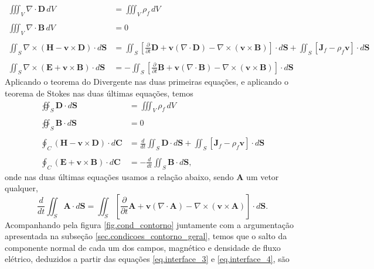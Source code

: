 \begin{align*}
\iiint_V\nabla\cdot\mathbf{D}\,dV&=\iiint_V\rho_f\,dV\\\\
\iiint_V\nabla\cdot\mathbf{B}\,dV&=0\\\\
\iint_S\nabla\times(\mathbf{H}-\mathbf{v}\times\mathbf{D})\cdot d\mathbf{S}&=\iint_S\left[\frac{\partial}{\partial t}\mathbf{D}+\mathbf{v}(\nabla\cdot\mathbf{D})-\nabla\times(\mathbf{v}\times\mathbf{B})\right]\cdot d\mathbf{S}+\iint_S\left[\mathbf{J}_f-\rho_f\mathbf{v}\right]\cdot d\mathbf{S}\\\\
\iint_S\nabla\times(\mathbf{E}+\mathbf{v}\times\mathbf{B})\cdot d\mathbf{S}&=-\iint_S\left[\frac{\partial}{\partial t}\mathbf{B}+\mathbf{v}(\nabla\cdot\mathbf{B})-\nabla\times(\mathbf{v}\times\mathbf{B})\right]\cdot d\mathbf{S}
\end{align*}
Aplicando o teorema do Divergente nas duas primeiras equa\c{c}\~oes, e aplicando o teorema de Stokes nas duas \'ultimas equa\c{c}\~oes, temos
\begin{align}\label{eq.interface_3}
\oiint_S\mathbf{D}\cdot d\mathbf{S}&=\iiint_V\rho_f\,dV\\\nonumber\\\label{eq.interface_4}
\oiint_S\mathbf{B}\cdot d\mathbf{S}&=0\\\nonumber\\\label{eq.interface_5}
\oint_C(\mathbf{H}-\mathbf{v}\times\mathbf{D})\cdot d\mathbf{C}&=\frac{d}{dt}\iint_S\mathbf{D}\cdot d\mathbf{S}+\iint_S\left[\mathbf{J}_f-\rho_f\mathbf{v}\right]\cdot d\mathbf{S}\\\nonumber\\\label{eq.interface_6}
\oint_C(\mathbf{E}+\mathbf{v}\times\mathbf{B})\cdot d\mathbf{C}&=-\frac{d}{dt}\iint_S\mathbf{B}\cdot d\mathbf{S},
\end{align} 
onde nas duas \'ultimas equa\c{c}\~oes usamos a rela\c{c}\~ao abaixo, sendo $\mathbf{A}$ um vetor qualquer,
\begin{equation*}
\frac{d}{dt}\iint_S\mathbf{A}\cdot d\mathbf{S}=\iint_S\left[\frac{\partial}{\partial t}\mathbf{A}+\mathbf{v}(\nabla\cdot\mathbf{A})-\nabla\times(\mathbf{v}\times\mathbf{A})\right]\cdot d\mathbf{S}.
\end{equation*}
Acompanhando pela figura \ref{fig.cond_contorno} juntamente com a argumenta\c{c}\~ao apresentada na subse\c{c}\~ao \ref{sec.condicoes_contorno_geral}, temos que o salto da componente normal de cada um dos campos, magn\'etico e densidade de fluxo el\'etrico, deduzidos a partir das equa\c{c}\~oes \ref{eq.interface_3} e \ref{eq.interface_4}, s\~ao
